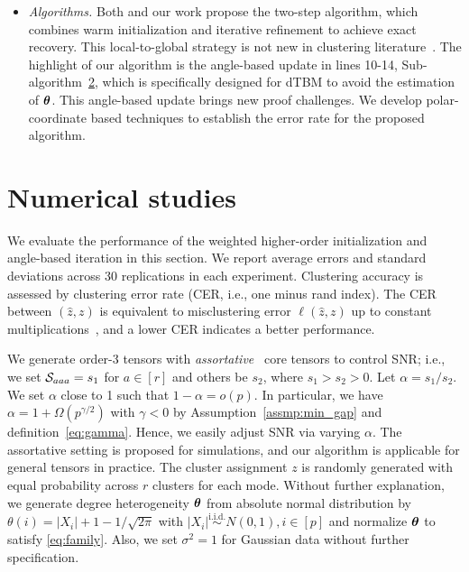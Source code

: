 \documentclass[journal]{IEEEtran}
\theoremstyle{definition}
\theoremstyle{definition}
\begin{document}
\begin{itemize}[wide]
 \item \textit{Algorithms.} Both \cite{han2020exact} and our work propose the two-step algorithm, which combines warm initialization and iterative refinement to achieve exact recovery. This local-to-global strategy is not new in clustering literature~\citep{gao2022iterative, chien2019minimax}. The highlight of our algorithm is the angle-based update in lines 10-14, Sub-algorithm~\hyperref[alg:main]{2}, which is specifically designed for dTBM to avoid the estimation of $\boldsymbol{\theta}$. This angle-based update brings new proof challenges. We develop polar-coordinate based techniques to establish the error rate for the proposed algorithm. 
\end{itemize}

\section{Numerical studies}\label{sec:simulation}

 We evaluate the performance of the weighted higher-order initialization and angle-based iteration in this section. We report average errors and standard deviations across 30 replications in each experiment. Clustering accuracy is assessed by clustering error rate (CER, i.e., one minus rand index). The CER between $(\hat z, z)$ is equivalent to misclustering error $\ell(\hat z, z)$ up to constant multiplications~\citep{meilua2012local}, and a lower CER indicates a better performance.

We generate order-3 tensors with \emph{assortative}~\citep{gao2018community} core tensors to control SNR; i.e., we set $\mathcal{S}_{aaa} = s_1$ for $a \in [r]$ and others be $s_2$, where $s_1 > s_2 > 0$. Let $\alpha = s_1/s_2$. We set $\alpha$ close to 1 such that $1-\alpha=o(p)$. In particular, we have $\alpha = 1 + \Omega(p^{\gamma/2})$ with $\gamma<0$ by Assumption~\ref{assmp:min_gap} and definition~\eqref{eq:gamma}. Hence, we easily adjust SNR via varying $\alpha$. The assortative setting is proposed for simulations, and our algorithm is applicable for general tensors in practice. The cluster assignment $z$ is randomly generated with equal probability across  $r$ clusters for each mode. Without further explanation, we generate degree heterogeneity $\boldsymbol{\theta}$ from absolute normal distribution by $\theta(i) = |X_i| + 1 - 1/\sqrt{2\pi}$ with $|X_i| \stackrel{\text{i.i.d.}}\sim N(0,1), i \in [p]$ and normalize $\boldsymbol{\theta}$ to satisfy \eqref{eq:family}. Also, we set $\sigma^2 = 1$ for Gaussian data without further specification. 
\end{document}
